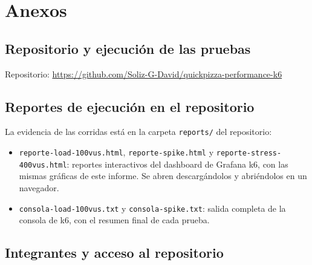 \documentclass[11pt]{article}
\makeatletter
\newcommand{\repoURL}{https://github.com/Soliz-G-David/quickpizza-performance-k6}
\newcommand{\prompt}{{\color{bashVerde}PC- DAVID@LAPTOP-QNOIOQBU} {\color{bashMorado}MINGW64} {\color{bashAmarillo}\textasciitilde/quickpizza-performance-k6}}
\makeatother
\begin{document}
\section{Anexos}

\subsection{Repositorio y ejecución de las pruebas}

Repositorio: \url{\repoURL}


\subsection{Reportes de ejecución en el repositorio}

La evidencia de las corridas está en la carpeta \texttt{reports/} del repositorio:

\begin{itemize}
  \item \texttt{reporte-load-100vus.html}, \texttt{reporte-spike.html} y
        \texttt{reporte-stress-400vus.html}: reportes interactivos del dashboard de
        Grafana k6, con las mismas gráficas de este informe. Se abren descargándolos
        y abriéndolos en un navegador.
  \item \texttt{consola-load-100vus.txt} y \texttt{consola-spike.txt}: salida
        completa de la consola de k6, con el resumen final de cada prueba.
\end{itemize}

\subsection{Integrantes y acceso al repositorio}
\end{document}

